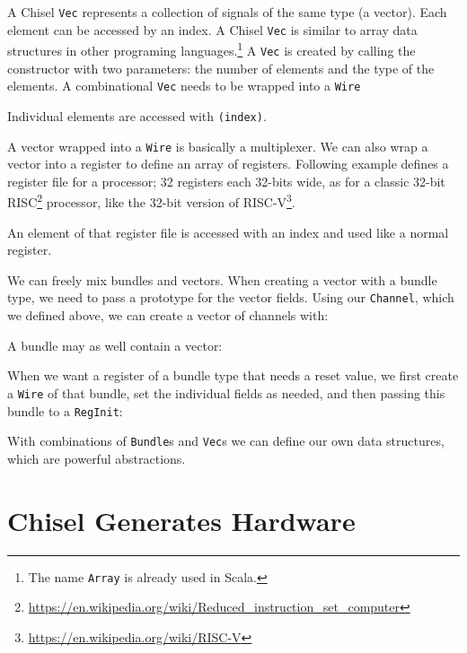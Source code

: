 \documentclass[%
    10pt,
    headinclude, footexclude,
    openright, %
    notitlepage,
    cleardoubleempty,
    headsepline,
    pointlessnumbers,
    bibtotoc, idxtotoc,
    ]{scrbook}
\newcommand{\code}[1]{{\small{\texttt{#1}}}}
\newcommand{\codefoot}[1]{{\footnotesize{\texttt{#1}}}}
\newcommand{\myref}[2]{\href{#1}{#2}}
\renewcommand{\myref}[2]{{#2}{\footnote{\url{#1}}}}
\begin{document}

A Chisel \code{Vec} represents a collection of signals of the same type (a vector).
Each element can be accessed by an index. A Chisel \code{Vec} is similar
to array data structures in other programing languages.\footnote{The name \codefoot{Array}
is already used in Scala.}
A \code{Vec} is created by calling the constructor with two parameters: the
number of elements and the type of the elements. A combinational \code{Vec}
needs to be wrapped into a \code{Wire}


\noindent Individual elements are accessed with \code{(index)}.


A vector wrapped into a \code{Wire} is basically a multiplexer.
We can also wrap a vector into a register to define an array of registers.
Following example defines a register file for a processor; 32 registers
each 32-bits wide, as for a classic 32-bit 
\myref{https://en.wikipedia.org/wiki/Reduced_instruction_set_computer}{RISC}
processor, like the 32-bit version of \myref{https://en.wikipedia.org/wiki/RISC-V}{RISC-V}.


\noindent An element of that register file is accessed with an index and used like a normal register.


We can freely mix bundles and vectors. When creating a vector with a bundle
type, we need to pass a prototype for the vector fields. Using our
\code{Channel}, which we defined above, we can create a vector of channels with:


\noindent A bundle may as well contain a vector:


When we want a register of a bundle type that needs a reset value,
we first create a \code{Wire} of that bundle, set the individual fields
as needed, and then passing this bundle to a \code{RegInit}:


With combinations of \code{Bundle}s and \code{Vec}s we can define our own data
structures, which are powerful abstractions.

\section{Chisel Generates Hardware}
\end{document}
